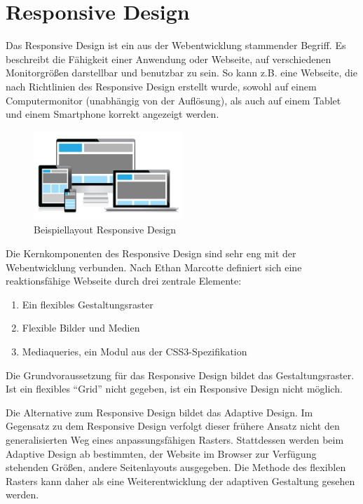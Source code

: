 \section{Responsive Design}
Das Responsive Design ist ein aus der Webentwicklung stammender Begriff. Es beschreibt die Fähigkeit einer Anwendung oder Webseite, auf verschiedenen Monitorgrößen darstellbar und benutzbar zu sein. So kann z.B. eine Webseite, die nach Richtlinien des Responsive Design erstellt wurde, sowohl auf einem Computermonitor (unabhängig von der Auflösung), als auch auf einem Tablet und einem Smartphone korrekt angezeigt werden.\par
\begin{figure}[H]
 \centering
 \includegraphics[width=0.5\textwidth]{grafiken/responsive_design.png}
 \caption{Beispiellayout Responsive Design \cite{Moon2013}}
 \label{fig:responsiveDesign}
\end{figure}
Die Kernkomponenten des Responsive Design sind sehr eng mit der Webentwicklung verbunden. Nach Ethan Marcotte definiert sich eine reaktionsfähige Webseite durch drei zentrale Elemente:
\begin{enumerate}
 \item Ein flexibles Gestaltungsraster
 \item Flexible Bilder und Medien
 \item Mediaqueries, ein Modul aus der CSS3-Spezifikation \cite[S. 15]{Zillgens2012}
\end{enumerate}
Die Grundvoraussetzung für das Responsive Design bildet das Gestaltungsraster. Ist ein flexibles \enquote{Grid} nicht gegeben, ist ein Responsive Design nicht möglich.\cite{Zillgens2012}\par
Die Alternative zum Responsive Design bildet das Adaptive Design. Im Gegensatz zu dem Responsive Design verfolgt dieser frühere Ansatz nicht den generalisierten Weg eines anpassungsfähigen Rasters. Stattdessen werden beim Adaptive Design ab bestimmten, der Website im Browser zur Verfügung stehenden Größen, andere Seitenlayouts ausgegeben. Die Methode des flexiblen Rasters kann daher als eine Weiterentwicklung der adaptiven Gestaltung gesehen werden.\cite[S. 14]{Zillgens2012}\par
